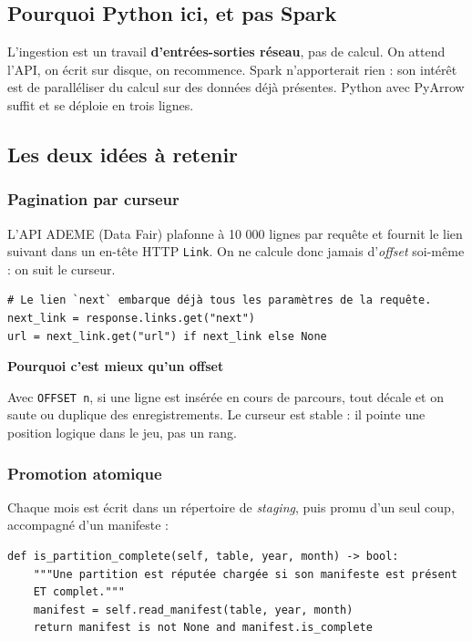 \documentclass[11pt,a4paper]{article}
\newcommand{\cmd}[1]{\texttt{\small #1}}
\newcommand{\titrebloc}[1]{\textbf{\color{encre}#1}\par\vspace{0.25em}}
\begin{document}
\subsection{Pourquoi Python ici, et pas Spark}

\begin{pourquoi}
L'ingestion est un travail \textbf{d'entrées-sorties réseau}, pas de calcul.
On attend l'API, on écrit sur disque, on recommence. Spark n'apporterait rien :
son intérêt est de paralléliser du calcul sur des données déjà présentes.
Python avec PyArrow suffit et se déploie en trois lignes.
\end{pourquoi}

\subsection{Les deux idées à retenir}

\subsubsection{Pagination par curseur}

L'API ADEME (Data Fair) plafonne à 10 000 lignes par requête et fournit le
lien suivant dans un en-tête HTTP \cmd{Link}. On ne calcule donc jamais
d'\emph{offset} soi-même : on suit le curseur.

\begin{lstlisting}[style=py]
# Le lien `next` embarque déjà tous les paramètres de la requête.
next_link = response.links.get("next")
url = next_link.get("url") if next_link else None
\end{lstlisting}

\begin{pourquoi}
\titrebloc{Pourquoi c'est mieux qu'un offset}
Avec \cmd{OFFSET n}, si une ligne est insérée en cours de parcours, tout
décale et on saute ou duplique des enregistrements. Le curseur est stable :
il pointe une position logique dans le jeu, pas un rang.
\end{pourquoi}

\subsubsection{Promotion atomique}

Chaque mois est écrit dans un répertoire de \emph{staging}, puis promu d'un
seul coup, accompagné d'un manifeste :

\begin{lstlisting}[style=py]
def is_partition_complete(self, table, year, month) -> bool:
    """Une partition est réputée chargée si son manifeste est présent
    ET complet."""
    manifest = self.read_manifest(table, year, month)
    return manifest is not None and manifest.is_complete
\end{lstlisting}
\end{document}
